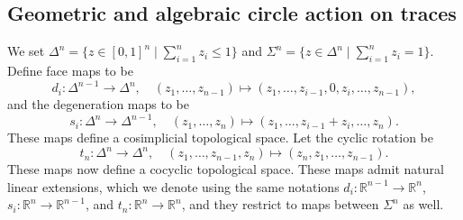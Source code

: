 \documentclass[11pt]{amsart}
\numberwithin{equation}{section}
\theoremstyle{plain}
\theoremstyle{definition}
\theoremstyle{remark}
\newcommand{\bR} { {\mathbb{R}}}
\begin{document}
\subsection{Geometric and algebraic circle action on traces}
\newcommand{\RelTr}{\operatorname{RelTr}}




We set $\Delta^n=\{z\in [0,1]^{n}\mid \sum_{i=1
}^n z_i\leq 1\}$ and $\Sigma^n=\{z\in \Delta^{n}\mid \sum_{i=1
}^n z_i = 1\}$. Define face maps to be
\[d_i: \Delta^{n-1} \to \Delta^n, \quad (z_1, \dots, z_{n-1}) \mapsto (z_1, \dots, z_{i-1}, 0, z_{i}, \dots, z_{n-1}),\]
and the degeneration maps to be 
\[s_i: \Delta^n \to \Delta^{n-1}, \quad (z_1, \dots, z_n) \mapsto (z_1, \dots, z_{i-1} + z_{i}, \dots, z_n).\]
These maps define a cosimplicial topological space. Let the cyclic rotation be
\[t_n: \Delta^n \to \Delta^n, \quad (z_1, \dots, z_{n-1}, z_n) \mapsto (z_n, z_1, \dots, z_{n-1}).\]
These maps now define a cocyclic topological space. These maps admit natural linear extensions, which we denote using the same notations $d_i: \bR^{n-1} \to \bR^n$, $s_i: \bR^n \to \bR^{n-1}$, and $t_n: \bR^n \to \bR^n$, and they restrict to maps between $\Sigma^n$ as well.
\end{document}
